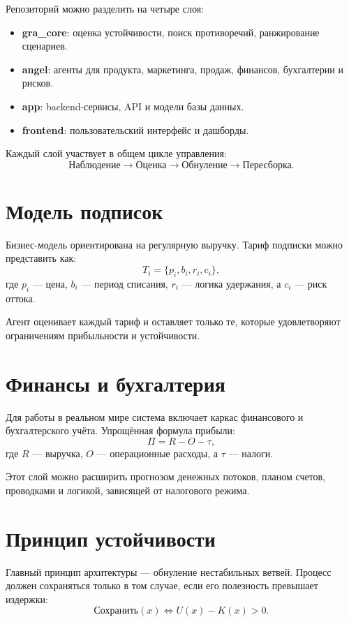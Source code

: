 \documentclass[11pt,a4paper]{article}
\begin{document}
Репозиторий можно разделить на четыре слоя:

\begin{itemize}[leftmargin=1.2cm]
    \item \textbf{gra\_core}: оценка устойчивости, поиск противоречий, ранжирование сценариев.
    \item \textbf{angel}: агенты для продукта, маркетинга, продаж, финансов, бухгалтерии и рисков.
    \item \textbf{app}: backend-сервисы, API и модели базы данных.
    \item \textbf{frontend}: пользовательский интерфейс и дашборды.
\end{itemize}

Каждый слой участвует в общем цикле управления:
\[
\text{Наблюдение} \rightarrow \text{Оценка} \rightarrow \text{Обнуление} \rightarrow \text{Пересборка}.
\]

\section{Модель подписок}

Бизнес-модель ориентирована на регулярную выручку. Тариф подписки можно представить как:
\[
T_i = \{p_i, b_i, r_i, c_i\},
\]
где $p_i$ — цена, $b_i$ — период списания, $r_i$ — логика удержания, а $c_i$ — риск оттока.

Агент оценивает каждый тариф и оставляет только те, которые удовлетворяют ограничениям прибыльности и устойчивости.

\section{Финансы и бухгалтерия}

Для работы в реальном мире система включает каркас финансового и бухгалтерского учёта. Упрощённая формула прибыли:
\[
\Pi = R - O - \tau,
\]
где $R$ — выручка, $O$ — операционные расходы, а $\tau$ — налоги.

Этот слой можно расширить прогнозом денежных потоков, планом счетов, проводками и логикой, зависящей от налогового режима.

\section{Принцип устойчивости}

Главный принцип архитектуры — обнуление нестабильных ветвей. Процесс должен сохраняться только в том случае, если его полезность превышает издержки:
\[
\text{Сохранить}(x) \iff U(x) - K(x) > 0.
\]
\end{document}
